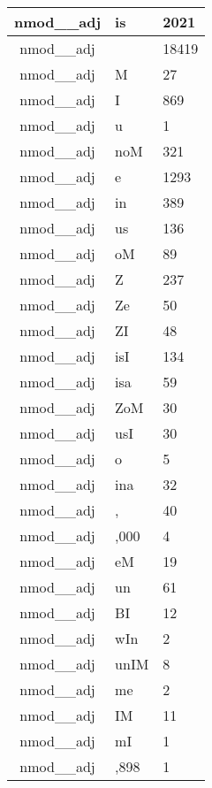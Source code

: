 \documentclass[a4 paper]{article}
\begin{document}
\begin{longtable}{cp{}p{}}
nmod\_\_adj & is & 2021\\ \midrule nmod\_\_adj &  & 18419\\ \midrule nmod\_\_adj & M & 27\\ \midrule nmod\_\_adj & I & 869\\ \midrule nmod\_\_adj & u & 1\\ \midrule nmod\_\_adj & noM & 321\\ \midrule nmod\_\_adj & e & 1293\\ \midrule nmod\_\_adj & in & 389\\ \midrule nmod\_\_adj & us & 136\\ \midrule nmod\_\_adj & oM & 89\\ \midrule nmod\_\_adj & Z & 237\\ \midrule nmod\_\_adj & Ze & 50\\ \midrule nmod\_\_adj & ZI & 48\\ \midrule nmod\_\_adj & isI & 134\\ \midrule nmod\_\_adj & isa & 59\\ \midrule nmod\_\_adj & ZoM & 30\\ \midrule nmod\_\_adj & usI & 30\\ \midrule nmod\_\_adj & o & 5\\ \midrule nmod\_\_adj & ina & 32\\ \midrule nmod\_\_adj & , & 40\\ \midrule nmod\_\_adj & ,000 & 4\\ \midrule nmod\_\_adj & eM & 19\\ \midrule nmod\_\_adj & un & 61\\ \midrule nmod\_\_adj & BI & 12\\ \midrule nmod\_\_adj & wIn & 2\\ \midrule nmod\_\_adj & unIM & 8\\ \midrule nmod\_\_adj & me & 2\\ \midrule nmod\_\_adj & IM & 11\\ \midrule nmod\_\_adj & mI & 1\\ \midrule nmod\_\_adj & ,898 & 1\\ \midrule 
\end{longtable}
\end{document}
